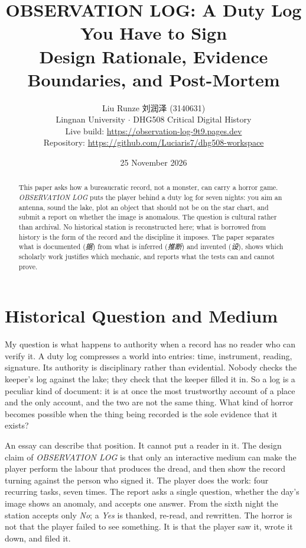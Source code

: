 \documentclass[12pt,a4paper]{article}
\title{\textbf{OBSERVATION LOG: A Duty Log You Have to Sign}\\[0.3em]
\large Design Rationale, Evidence Boundaries, and Post-Mortem}
\author{Liu Runze 刘润泽 (3140631)\\Lingnan University $\cdot$ DHG508 Critical Digital History\\
\small Live build: \url{https://observation-log-9t9.pages.dev}\\
\small Repository: \url{https://github.com/Luciaris7/dhg508-workspace}}
\date{25 November 2026}
\begin{document}
\maketitle

\begin{abstract}
\noindent
This paper asks how a bureaucratic record, not a monster, can carry a horror
game. \emph{OBSERVATION LOG} puts the player behind a duty log for seven nights:
you aim an antenna, sound the lake, plot an object that should not be on the
star chart, and submit a report on whether the image is anomalous. The question
is cultural rather than archival. No historical station is reconstructed here;
what is borrowed from history is the form of the record and the discipline it
imposes. The paper separates what is documented (\emph{据}) from what is inferred
(\emph{推断}) and invented (\emph{设}), shows which scholarly work justifies which
mechanic, and reports what the tests can and cannot prove.
\end{abstract}

\onehalfspacing

\section{Historical Question and Medium}

My question is what happens to authority when a record has no reader who can
verify it. A duty log compresses a world into entries: time, instrument, reading,
signature. Its authority is disciplinary rather than evidential. Nobody checks
the keeper's log against the lake; they check that the keeper filled it in. So a
log is a peculiar kind of document: it is at once the most trustworthy account of
a place and the only account, and the two are not the same thing. What kind of
horror becomes possible when the thing being recorded is the sole evidence that
it exists?

An essay can describe that position. It cannot put a reader in it. The design
claim of \emph{OBSERVATION LOG} is that only an interactive medium can make the
player perform the labour that produces the dread, and then show the record
turning against the person who signed it. The player does the work: four
recurring tasks, seven times. The report asks a single question, whether the day's
image shows an anomaly, and accepts one answer. From the sixth night the station
accepts only \emph{No}; a \emph{Yes} is thanked, re-read, and rewritten. The horror
is not that the player failed to see something. It is that the player saw it,
wrote it down, and filed it.
\end{document}
